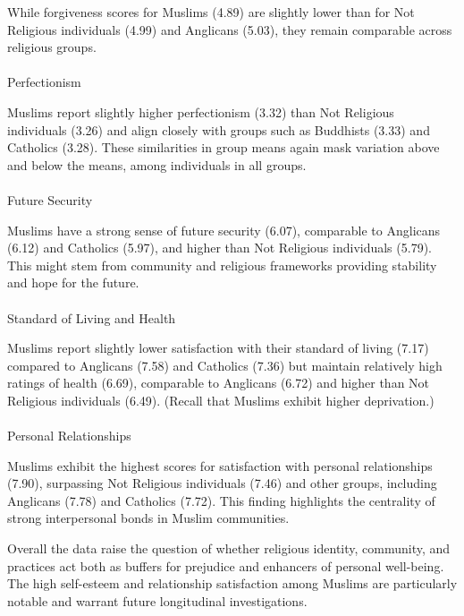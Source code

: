 \documentclass[
  single column]{article}
\makeatletter
\let\oldparagraph\paragraph
\renewcommand{\paragraph}{
    \@ifstar
      \xxxParagraphStar
      \xxxParagraphNoStar
  }
\newcommand{\xxxParagraphStar}[1]{\oldparagraph*{#1}\mbox{}}
\newcommand{\xxxParagraphNoStar}[1]{\oldparagraph{#1}\mbox{}}
\makeatother
\begin{document}
While forgiveness scores for Muslims (4.89) are slightly lower than for
Not Religious individuals (4.99) and Anglicans (5.03), they remain
comparable across religious groups.

\paragraph{Perfectionism}\label{perfectionism}

Muslims report slightly higher perfectionism (3.32) than Not Religious
individuals (3.26) and align closely with groups such as Buddhists
(3.33) and Catholics (3.28). These similarities in group means again
mask variation above and below the means, among individuals in all
groups.

\paragraph{Future Security}\label{future-security}

Muslims have a strong sense of future security (6.07), comparable to
Anglicans (6.12) and Catholics (5.97), and higher than Not Religious
individuals (5.79). This might stem from community and religious
frameworks providing stability and hope for the future.

\paragraph{Standard of Living and
Health}\label{standard-of-living-and-health}

Muslims report slightly lower satisfaction with their standard of living
(7.17) compared to Anglicans (7.58) and Catholics (7.36) but maintain
relatively high ratings of health (6.69), comparable to Anglicans (6.72)
and higher than Not Religious individuals (6.49). (Recall that Muslims
exhibit higher deprivation.)

\paragraph{Personal Relationships}\label{personal-relationships}

Muslims exhibit the highest scores for satisfaction with personal
relationships (7.90), surpassing Not Religious individuals (7.46) and
other groups, including Anglicans (7.78) and Catholics (7.72). This
finding highlights the centrality of strong interpersonal bonds in
Muslim communities.

Overall the data raise the question of whether religious identity,
community, and practices act both as buffers for prejudice and enhancers
of personal well-being. The high self-esteem and relationship
satisfaction among Muslims are particularly notable and warrant future
longitudinal investigations.
\end{document}
